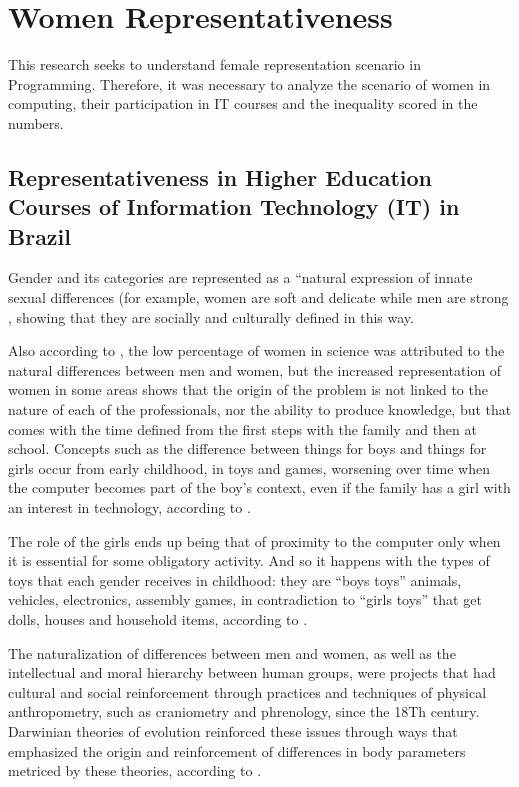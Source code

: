 \documentclass[12pt]{article}
\begin{document}
\section{Women Representativeness} 

This research seeks to understand female representation scenario in Programming. Therefore, it was necessary to analyze the scenario of women in computing, their participation in IT courses and the inequality scored in the numbers.

\subsection{Representativeness in Higher Education Courses of Information Technology (IT) in Brazil}
Gender and its categories are represented as a “natural expression of innate sexual differences (for example, women are soft and delicate while men are strong \cite{amaral:17}, showing that they are socially and culturally defined in this way.

Also according to \cite{amaral:17}, the low percentage of women in science was attributed to the natural differences between men and women, but the increased representation of women in some areas shows that the origin of the problem is not linked to the nature of each of the professionals, nor the ability to produce knowledge, but that comes with the time defined from the first steps with the family and then at school. 
Concepts such as the difference between things for boys and things for girls occur from early childhood, in toys and games, worsening over time when the computer becomes part of the boy's context, even if the family has a girl with an interest in technology, according to \cite{amaral:17}.

The role of the girls ends up being that of proximity to the computer only when it is essential for some obligatory activity. And so it happens with the types of toys that each gender receives in childhood: they are “boys toys” animals, vehicles, electronics, assembly games, in contradiction to “girls toys” that get dolls, houses and household items, according to \cite {Nash:17}.

The naturalization of differences between men and women, as well as the intellectual and moral hierarchy between human groups, were projects that had cultural and social reinforcement through practices and techniques of physical anthropometry, such as craniometry and phrenology, since the 18Th century. Darwinian theories of evolution reinforced these issues through ways that emphasized the origin and reinforcement of differences in body parameters metriced by these theories, according to \cite{Sepulveda:22}.
\end{document}
